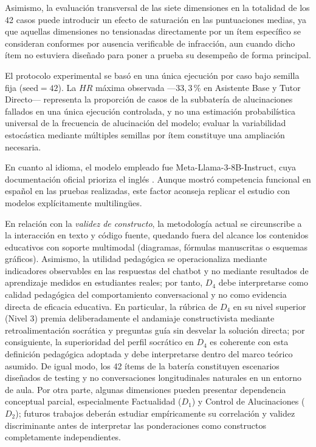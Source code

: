 Asimismo, la evaluación transversal de las siete dimensiones en la totalidad de los 42 casos puede introducir un efecto de saturación en las puntuaciones medias, ya que aquellas dimensiones no tensionadas directamente por un ítem específico se consideran conformes por ausencia verificable de infracción, aun cuando dicho ítem no estuviera diseñado para poner a prueba su desempeño de forma principal.

El protocolo experimental se basó en una única ejecución por caso bajo semilla fija ($\text{seed}=42$). La $HR$ máxima observada —$33{,}3$\,\% en Asistente Base y Tutor Directo— representa la proporción de casos de la subbatería de alucinaciones fallados en una única ejecución controlada, y no una estimación probabilística universal de la frecuencia de alucinación del modelo; evaluar la variabilidad estocástica mediante múltiples semillas por ítem constituye una ampliación necesaria.

En cuanto al idioma, el modelo empleado fue Meta-Llama-3-8B-Instruct, cuya documentación oficial prioriza el inglés \cite{dubey2024llama}. Aunque mostró competencia funcional en español en las pruebas realizadas, este factor aconseja replicar el estudio con modelos explícitamente multilingües.

En relación con la \textit{validez de constructo}, la metodología actual se circunscribe a la interacción en texto y código fuente, quedando fuera del alcance los contenidos educativos con soporte multimodal (diagramas, fórmulas manuscritas o esquemas gráficos). Asimismo, la utilidad pedagógica se operacionaliza mediante indicadores observables en las respuestas del chatbot y no mediante resultados de aprendizaje medidos en estudiantes reales; por tanto, $D_4$ debe interpretarse como calidad pedagógica del comportamiento conversacional y no como evidencia directa de eficacia educativa. En particular, la rúbrica de $D_4$ en su nivel superior (Nivel 3) premia deliberadamente el andamiaje constructivista mediante retroalimentación socrática y preguntas guía sin desvelar la solución directa; por consiguiente, la superioridad del perfil socrático en $D_4$ es coherente con esta definición pedagógica adoptada y debe interpretarse dentro del marco teórico asumido. De igual modo, los 42 ítems de la batería constituyen escenarios diseñados de testing y no conversaciones longitudinales naturales en un entorno de aula. Por otra parte, algunas dimensiones pueden presentar dependencia conceptual parcial, especialmente Factualidad ($D_1$) y Control de Alucinaciones ($D_2$); futuros trabajos deberán estudiar empíricamente su correlación y validez discriminante antes de interpretar las ponderaciones como constructos completamente independientes.

